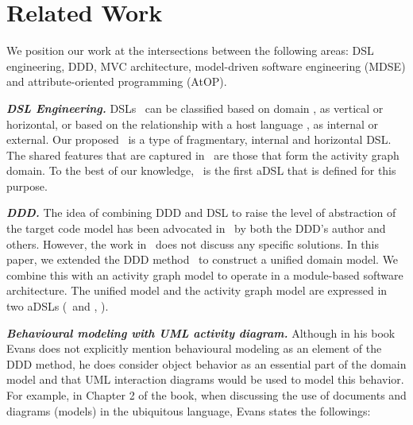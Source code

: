 %
\section{Related Work}\label{sect:relatedwork} %
We position our work at the intersections between the following areas: DSL engineering, DDD, MVC architecture, model-driven software engineering (MDSE) and attribute-oriented programming (AtOP).

\textbf{\textit{DSL Engineering.}}
DSLs~\cite{van_deursen_domain-specific_2000, mernik_when_2005} can be classified based on domain \cite{kleppe_software_2008}, as vertical or horizontal, or based on the relationship with a host language \cite{fowler_domain-specific_2010, van_deursen_domain-specific_2000, mernik_when_2005}, as internal or external. 
%
Our proposed \agl~is a type of fragmentary, internal and horizontal DSL. The shared features that are captured in \agl~are those that form the activity graph domain. To the best of our knowledge, \agl~is the first aDSL that is defined for this purpose.

\textbf{\textit{DDD.}}
The idea of combining DDD and DSL to raise the level of 
abstraction of the target code model has been advocated in~\cite{fowler_domain-specific_2010} by both the DDD's author and others. However, the work in~\cite{fowler_domain-specific_2010} does not discuss any specific solutions.
In this paper, we extended the DDD method~\cite{evans_domain-driven_2004} to construct a unified domain model. We combine this with an activity graph model to operate in a module-based software architecture. The unified model and the activity graph model are expressed in two aDSLs (\dcsl~and \agl, \resp).

\textbf{\textit{Behavioural modeling with UML activity diagram.}}
Although in his book~\cite{evans_domain-driven_2004} Evans does not explicitly mention behavioural modeling as an element of the DDD method, he does consider object behavior as an essential part of the domain model and that UML interaction diagrams would be used to model this behavior. For example, in Chapter 2 of the book, when discussing the use of documents and diagrams (\ie models) in the ubiquitous language, Evans states the followings:

